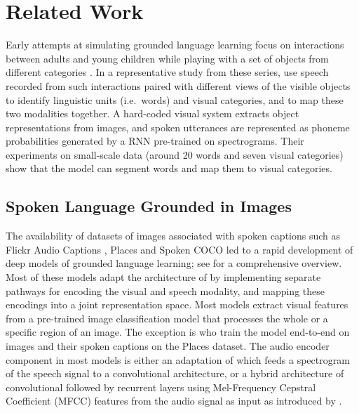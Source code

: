 \section{Related Work}
\label{sec:related}

Early attempts at simulating grounded language learning focus on
interactions between adults and young children while playing with a
set of objects from different categories \cite{roy1999learning,
  roy2000grounded, roy2000learning, roy2002learning,
  gorniak2003visually, mukherjee2003visual}. In a representative study
from these series, \citet{roypentland2002learning} use speech recorded from
such interactions paired with different views of the visible objects
to identify linguistic units (i.e.\ words) and visual categories, and
to map these two modalities together. A hard-coded visual system
extracts object representations from images, and spoken utterances are
represented as phoneme probabilities generated by a RNN pre-trained on
spectrograms.  Their experiments on small-scale data (around 20 words
and seven visual categories) show that the model can segment words and
map them to visual categories.

\subsection{Spoken Language Grounded in Images}
\label{sec:images}
The availability of datasets of images associated with spoken captions
such as Flickr Audio Captions \citep{harwath2015deep}, Places
\cite{zhou2014learning} and Spoken COCO \citep{hsu2019transfer} led to
a rapid development of deep models of grounded language learning; see
\citet{chrupala-visually-2021} for a comprehensive overview. Most of
these models adapt the architecture of \citet{karpathy2014deep} by
implementing separate pathways for encoding the visual and speech
modality, and mapping these encodings into a joint representation
space. Most models extract visual features from a pre-trained
image classification model that processes the whole or a specific
region of an image. The exception is \citet{harwath2018jointly} who train the
model end-to-end on images and their spoken captions on the Places
dataset. The audio encoder component in most models is 
either an adaptation of \citet{harwath2016unsupervised} which feeds a
spectrogram of the speech signal to a convolutional architecture, or a
hybrid architecture of convolutional followed by recurrent layers using
Mel-Frequency Cepstral Coefficient (MFCC) features from the audio
signal as input as introduced by \citet{chrupala-etal-2017-representations}.

